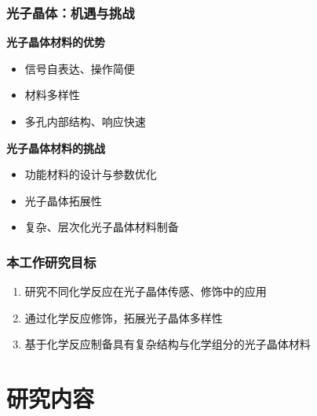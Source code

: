 \documentclass{beamer}
\begin{document}

\begin{frame}
  \frametitle{光子晶体：机遇与挑战}
  \pause
  \textcolor{tsinghua}{\textbf{光子晶体材料的优势}}
  \begin{itemize}[<+-| alert@+>]
    \item
    信号自表达、操作简便
    \item
    材料多样性
    \item
    多孔内部结构、响应快速
  \end{itemize}
  \pause
  \textcolor{tsinghua}{\textbf{光子晶体材料的挑战}}
  \begin{itemize}[<+-| alert@+>]
    \item
    功能材料的设计与参数优化
    \item
    光子晶体拓展性
    \item
    复杂、层次化光子晶体材料制备
  \end{itemize}
\end{frame}

\begin{frame}
  \frametitle{本工作研究目标}
  \begin{enumerate}[<+-| alert@+>]
    \item
     研究不同化学反应在光子晶体传感、修饰中的应用
    \item
     通过化学反应修饰，拓展光子晶体多样性
    \item
     基于化学反应制备具有复杂结构与化学组分的光子晶体材料
  \end{enumerate}
\end{frame}

\section{研究内容}

\end{document}
